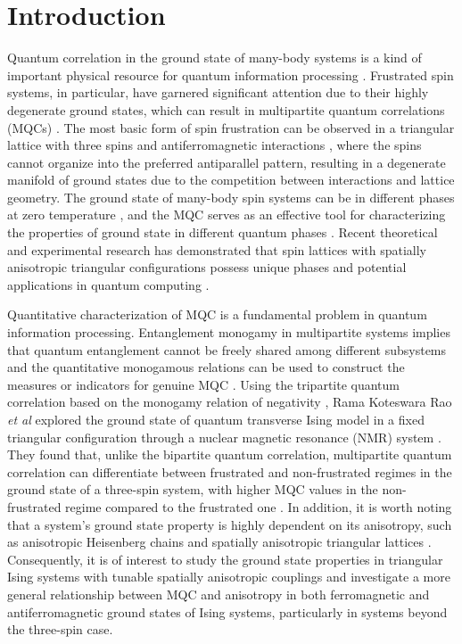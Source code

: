 \documentclass[pra,aps,twocolumn,showpacs]{revtex4}
\begin{document}
\section{Introduction}
Quantum correlation in the ground state of many-body systems is a kind of important physical resource for quantum information processing \cite{amico08rmp,horod09rmp,modi12rmp,bera18rpp}. Frustrated spin systems, in particular, have garnered significant attention due to their highly degenerate ground states, which can result in multipartite quantum correlations (MQCs) \cite{sach99book,chiara18rpp}.
The most basic form of spin frustration can be observed in a triangular lattice with three spins and antiferromagnetic interactions \cite{binder86rmp}, where the spins cannot organize into the preferred antiparallel pattern, resulting in a degenerate manifold of ground states due to the competition between interactions and lattice geometry.
The ground state of many-body spin systems can be in different phases at zero temperature \cite{sach99book}, and the MQC serves as an effective tool for characterizing the properties of ground state in different quantum phases \cite{weitc05pra,olivei06pra,olivei06prl,facchi10njp,mon10pra,giampa13pra,sunzy14pra,hofm14prb,Bayat17prl,Yamasaki18pra,haldar20prb}. Recent theoretical and experimental research has demonstrated that spin lattices with spatially anisotropic triangular configurations possess unique phases and potential applications in quantum computing \cite{Yoshida15np,Zhang16prl,Ito16prb,Keles18prl,Tala20prapp}.

Quantitative characterization of MQC is a fundamental problem in quantum information processing. Entanglement monogamy in multipartite systems implies that quantum entanglement cannot be freely shared among different subsystems \cite{bennett96pra} and the quantitative monogamous relations can be used to construct the measures or indicators for genuine MQC \cite{coffman00pra,osborne06prl,christandl04jmp,fan07pra,byw07pra,kimjs09pra,bai06pra,byw09pra,kimjs10jpa,cornelio10pra,bxw14prl,songbai16pra,ren21npj,bai22pra}. Using the tripartite quantum correlation based on the monogamy relation of negativity \cite{fan07pra,vidal02pra}, Rama Koteswara Rao \emph{et al} explored the ground state of quantum transverse Ising model in a fixed triangular configuration through a nuclear magnetic resonance (NMR) system \cite{rkrao13pra}. They found that, unlike the bipartite quantum correlation, multipartite quantum correlation can differentiate between frustrated and non-frustrated regimes in the ground state of a three-spin system, with higher MQC values in the non-frustrated regime compared to the frustrated one \cite{rkrao13pra}. In addition, it is worth noting that a system's ground state property is highly dependent on its anisotropy, such as anisotropic Heisenberg chains \cite{wang01pla,kamta02prl,zhou03pra,zhang05pra} and spatially anisotropic triangular lattices \cite{yunoki06prb,eckardt10epl,hauke13prb}. Consequently, it is of interest to study the ground state properties in triangular Ising systems with tunable spatially anisotropic couplings and investigate a more general relationship between MQC and anisotropy in both ferromagnetic and antiferromagnetic ground states of Ising systems, particularly in systems beyond the three-spin case.
\end{document}
